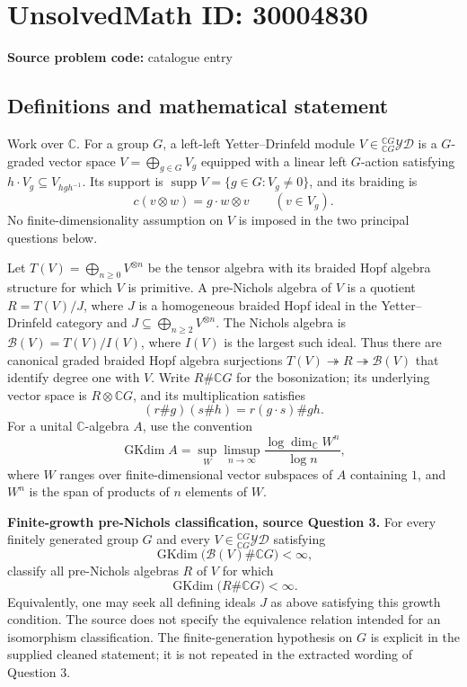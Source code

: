 \documentclass[11pt]{article}
\newcommand{\C}{\mathbb{C}}
\begin{document}
\section*{UnsolvedMath ID: 30004830}
\textbf{Source problem code:} catalogue entry
\subsection{Definitions and mathematical statement}
Work over \(\C\). For a group \(G\), a left-left Yetter--Drinfeld module \(V\in{}^{\C G}_{\C G}\mathcal{YD}\) is a \(G\)-graded vector space \(V=\bigoplus_{g\in G}V_g\) equipped with a linear left \(G\)-action satisfying \(h\cdot V_g\subseteq V_{hgh^{-1}}\). Its support is \(\operatorname{supp}V=\{g\in G:V_g\ne0\}\), and its braiding is
\[
c(v\otimes w)=g\cdot w\otimes v\qquad(v\in V_g).
\]
No finite-dimensionality assumption on \(V\) is imposed in the two principal questions below.

Let \(T(V)=\bigoplus_{n\ge0}V^{\otimes n}\) be the tensor algebra with its braided Hopf algebra structure for which \(V\) is primitive. A pre-Nichols algebra of \(V\) is a quotient \(R=T(V)/J\), where \(J\) is a homogeneous braided Hopf ideal in the Yetter--Drinfeld category and \(J\subseteq\bigoplus_{n\ge2}V^{\otimes n}\). The Nichols algebra is \(\mathcal B(V)=T(V)/I(V)\), where \(I(V)\) is the largest such ideal. Thus there are canonical graded braided Hopf algebra surjections \(T(V)\twoheadrightarrow R\twoheadrightarrow\mathcal B(V)\) that identify degree one with \(V\). Write \(R\#\C G\) for the bosonization; its underlying vector space is \(R\otimes\C G\), and its multiplication satisfies
\[
(r\#g)(s\#h)=r(g\cdot s)\#gh.
\]
For a unital \(\C\)-algebra \(A\), use the convention
\[
\operatorname{GKdim}A=\sup_W\limsup_{n\to\infty}\frac{\log\dim_{\C}W^n}{\log n},
\]
where \(W\) ranges over finite-dimensional vector subspaces of \(A\) containing \(1\), and \(W^n\) is the span of products of \(n\) elements of \(W\).

\textbf{Finite-growth pre-Nichols classification, source Question 3.} For every finitely generated group \(G\) and every \(V\in{}^{\C G}_{\C G}\mathcal{YD}\) satisfying
\[
\operatorname{GKdim}\bigl(\mathcal B(V)\#\C G\bigr)<\infty,
\]
classify all pre-Nichols algebras \(R\) of \(V\) for which
\[
\operatorname{GKdim}\bigl(R\#\C G\bigr)<\infty.
\]
Equivalently, one may seek all defining ideals \(J\) as above satisfying this growth condition. The source does not specify the equivalence relation intended for an isomorphism classification. The finite-generation hypothesis on \(G\) is explicit in the supplied cleaned statement; it is not repeated in the extracted wording of Question 3.
\end{document}
